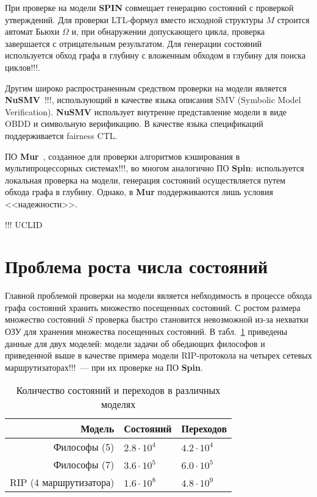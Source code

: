 \documentclass[a4paper,notitlepage,14pt]{article}
\begin{document}
При проверке на модели \textbf{SPIN} совмещает генерацию состояний с проверкой утверждений. Для
проверки LTL-формул вместо исходной структуры $M$ строится автомат Бьюхи $\Omega$ и, при
обнаружении допускающего цикла, проверка завершается с отрицательным результатом. Для
генерации состояний используется обход графа в глубину с вложенным обходом в глубину для
поиска циклов!!!.

Другим широко распространенным средством проверки на модели является
\textbf{NuSMV}~\cite{Cimatti00nusmv:a}!!!, использующий в качестве языка описания SMV
(Symbolic Model Verification). \textbf{NuSMV} использует внутренне представление модели в
виде OBDD и символьную верификацию. В качестве языка спецификаций поддерживается fairness
CTL.

ПО \textbf{Mur\phi}~\cite{Dill96murphi}, созданное для проверки алгоритмов кэширования в
мультипроцессорных системах!!!, во многом аналогично ПО \textbf{Spin}: используется
локальная проверка на модели, генерация состояний осуществляется путем обхода графа в
глубину. Однако, в \textbf{Mur\phi} поддерживаются лишь условия <<надежности>>.

!!! UCLID

\section{Проблема роста числа состояний}
\label{sec:state-explosion}

Главной проблемой проверки на модели является небходимость в процессе обхода графа
состояний хранить множество посещенных состояний. С ростом размера множество состояний $S$
проверка быстро становится невозможной из-за нехватки ОЗУ для хранения множества
посещенных состояний. В табл.~\ref{tab:models-statecount} приведены данные для двух
моделей: модели задачи об обедающих философов и приведенной выше в качестве примера модели
RIP-протокола на четырех сетевых маршрутизаторах!!!~--- при их проверке на ПО
\textbf{Spin}.

\begin{table}
  \centering
  \begin{tabular}{|r|l|l|}
    \hline
    Модель                  & Состояний         & Переходов       \\
    \hline
    Философы (5)            & $2.8 \cdot 10^4$  & $4.2 \cdot 10^4$ \\
    Философы (7)            & $3.6 \cdot 10^5$  & $6.0 \cdot 10^5$ \\
    RIP (4 маршрутизатора)  & $1.6 \cdot 10^8$  & $4.8 \cdot 10^9$ \\
    \hline
  \end{tabular}
  \caption{Количество состояний и переходов в различных моделях}
\label{tab:models-statecount}
\end{table}
\end{document}
